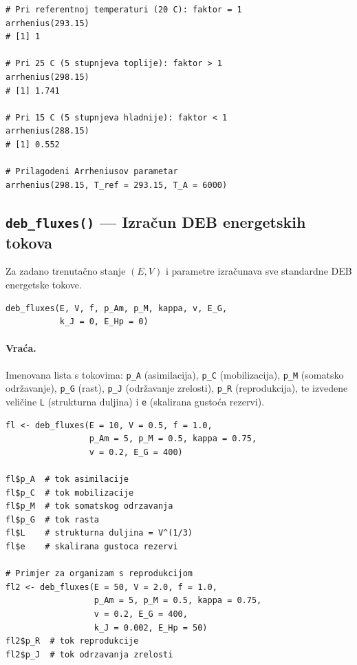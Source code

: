 \documentclass[11pt,a4paper]{article}
\newcommand{\fn}[1]{\texttt{#1()}}
\newcommand{\code}[1]{\texttt{#1}}
\begin{document}
\begin{lstlisting}
# Pri referentnoj temperaturi (20 C): faktor = 1
arrhenius(293.15)
# [1] 1

# Pri 25 C (5 stupnjeva toplije): faktor > 1
arrhenius(298.15)
# [1] 1.741

# Pri 15 C (5 stupnjeva hladnije): faktor < 1
arrhenius(288.15)
# [1] 0.552

# Prilagodeni Arrheniusov parametar
arrhenius(298.15, T_ref = 293.15, T_A = 6000)
\end{lstlisting}


\subsection{\fn{deb\_fluxes} --- Izračun DEB energetskih tokova}

Za zadano trenutačno stanje $(E, V)$ i parametre izračunava sve
standardne DEB energetske tokove.

\begin{lstlisting}
deb_fluxes(E, V, f, p_Am, p_M, kappa, v, E_G,
           k_J = 0, E_Hp = 0)
\end{lstlisting}

\paragraph{Vraća.} Imenovana lista s tokovima: \code{p\_A} (asimilacija),
\code{p\_C} (mobilizacija), \code{p\_M} (somatsko održavanje),
\code{p\_G} (rast), \code{p\_J} (održavanje zrelosti), \code{p\_R}
(reprodukcija), te izvedene veličine \code{L} (strukturna duljina) i
\code{e} (skalirana gustoća rezervi).

\begin{lstlisting}
fl <- deb_fluxes(E = 10, V = 0.5, f = 1.0,
                 p_Am = 5, p_M = 0.5, kappa = 0.75,
                 v = 0.2, E_G = 400)

fl$p_A  # tok asimilacije
fl$p_C  # tok mobilizacije
fl$p_M  # tok somatskog odrzavanja
fl$p_G  # tok rasta
fl$L    # strukturna duljina = V^(1/3)
fl$e    # skalirana gustoca rezervi

# Primjer za organizam s reprodukcijom
fl2 <- deb_fluxes(E = 50, V = 2.0, f = 1.0,
                  p_Am = 5, p_M = 0.5, kappa = 0.75,
                  v = 0.2, E_G = 400,
                  k_J = 0.002, E_Hp = 50)
fl2$p_R  # tok reprodukcije
fl2$p_J  # tok odrzavanja zrelosti
\end{lstlisting}


\end{document}
